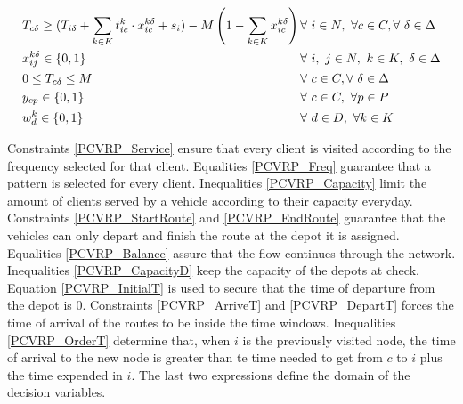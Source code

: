 \documentclass[preprint,review,12pt]{elsarticle}
\begin{document}
\begin{align}
	& T_{c\delta} \geq (T_{i\delta} + \sum\limits_{k \in K} t_{ic}^k \cdot  x_{ic}^{k\delta} + s_i) - M \left(1 - \sum\limits_{k \in K}x_{ic}^{k\delta} \right) \qquad && \text{\hspace{-1cm}} \forall \ i \in N,\ \forall c \in C, \forall \ \delta \in \Delta \label{PCVRP_OrderT}\\
	& x_{ij}^{k\delta} \in\{0,1\} && \text{\hspace{-1cm}} \forall \ i, \ j \in N,\ k \in K,\ \delta \in \Delta \label{PCVRP_DomainX}\\
	& 0 \leq T_{c\delta} \leq M && \text{\hspace{-1cm}} \forall \ c \in C, \forall \ \delta \in \Delta \label{PCVRP_DomainT}\\
	& y_{cp} \in\{0,1\} && \text{\hspace{-1cm}} \forall \ c \in C,\ \forall p \in P \label{PCVRP_DomainY}\\
	& w_d^k \in\{0,1\} && \text{\hspace{-1cm}} \forall \ d \in D,\ \forall k \in K \label{PCVRP_DomainW}
\end{align}

Constraints \eqref{PCVRP_Service} ensure that every client is visited according to the frequency selected for that client. Equalities \eqref{PCVRP_Freq} guarantee that a pattern is selected for every client. Inequalities \eqref{PCVRP_Capacity} limit the amount of clients served by a vehicle according to their capacity everyday. Constraints \eqref{PCVRP_StartRoute} and \eqref{PCVRP_EndRoute} guarantee that the vehicles can only depart and finish the route at the depot it is assigned. Equalities \eqref{PCVRP_Balance} assure that the flow continues through the network. Inequalities \eqref{PCVRP_CapacityD} keep the capacity of the depots at check. Equation \eqref{PCVRP_InitialT} is used to secure that the time of departure from the depot is 0. Constraints \eqref{PCVRP_ArriveT} and \eqref{PCVRP_DepartT} forces the time of arrival of the routes to be inside the time windows. Inequalities \eqref{PCVRP_OrderT} determine that, when $i$ is the previously visited node, the time of arrival to the new node is greater than te time needed to get from $c$ to $i$ plus the time expended in $i$. The last two expressions define the domain of the decision variables.
\end{document}
